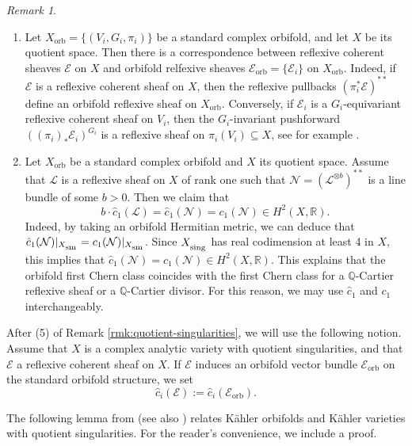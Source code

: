\documentclass[12pt]{amsart}
\newcommand{\<}{\leq}
\def\mcE{\mathcal{E}}
\def\mcL{\mathcal{L}}
\def\mcN{\mathcal{N}}
\theoremstyle{remark}
\newtheorem{remark}[theorem]{Remark}
\theoremstyle{definition}
\theoremstyle{definition}
\numberwithin{equation}{section}
\theoremstyle{definition}
\theoremstyle{definition}
\def\sm{\operatorname{\textsubscript{\rm sm}}}
\def\sing{\operatorname{\textsubscript{\rm sing}}}
\def\orb{\mathrm{orb}}
\begin{document}
\begin{remark}
\begin{enumerate}
\item  Let $X_{\orb}= \{(V_i,G_i, \pi_i)\}$ be a standard complex orbifold,  and let  $X$ be its quotient space. 
Then  there is a correspondence between  reflexive  coherent sheaves $\mcE$ on $X$  and  orbifold relfexive sheaves $\mcE_{\orb}=\{\mcE_i\}$ on $X_{\orb}$.
Indeed, if $\mcE$ is a reflexive coherent sheaf on $X$, then the reflexive pullbacks $(\pi_i^*\mcE)^{**}$ define  an orbifold reflexive sheaf on $X_{\orb}$. 
Conversely, if $\mcE_i$ is a $G_i$-equivariant reflexive coherent sheaf on $V_i$, then the $G_i$-invariant pushforward  $((\pi_i)_* \mcE_i)^{G_i}$ is a reflexive sheaf on $\pi_i(V_i) \subseteq X$,  see for example \cite[Lemma A.4]{GKKP11}.  




\item Let $X_{\orb}$ be a standard complex orbifold  and $X$ its quotient space. 
Assume that $\mcL$ is a reflexive sheaf on $X$ of rank one such that $\mcN=(\mcL^{\otimes b})^{**}$ is a line bundle of some $b>0$. 
Then we claim that
\[b\cdot \hat{c}_1(\mcL) = \hat{c}_1(\mcN)   = c_1(\mcN) \in H^2(X, \mathbb{R}).
\]
Indeed, by taking an orbifold  Hermitian metric, we can deduce that  $\hat{c}_1(\mcN)|_{X_{\sm}} = c_1(\mcN)|_{X_{\sm}}$.   
Since $X_{\sing}$ has real codimension at least 4 in $X$, this implies that 
$\hat{c}_1(\mcN)  = c_1(\mcN)  \in  H^2(X, \mathbb{R})$. 
This explains that the orbifold first Chern class coincides with the first Chern class for a $\mathbb{Q}$-Cartier reflexive sheaf or   a  $\mathbb{Q}$-Cartier divisor.  
For this reason, we may use  $\hat{c}_1$ and $c_1$ interchangeably.
\end{enumerate}
\end{remark}


After (5) of Remark \ref{rmk:quotient-singularities}, we will use the following notion.  
Assume that  $X$ is a complex analytic variety with quotient singularities, and that $\mcE$ a reflexive coherent sheaf on $X$. 
If $\mcE$ induces an orbifold vector bundle $\mcE_{\orb}$ on the standard orbifold structure, we set 
\[
\hat{c}_i(\mcE) := \hat{c}_i(\mcE_{\orb}).
\]



The following lemma from \cite[Lemma 1]{Wu23}  
(see  also  \cite[Construction 6.1]{CGNPPW}) 
relates K\"ahler orbifolds and K\"ahler varieties with quotient singularities.  
For the reader's convenience, we include a proof. 
\end{document}
